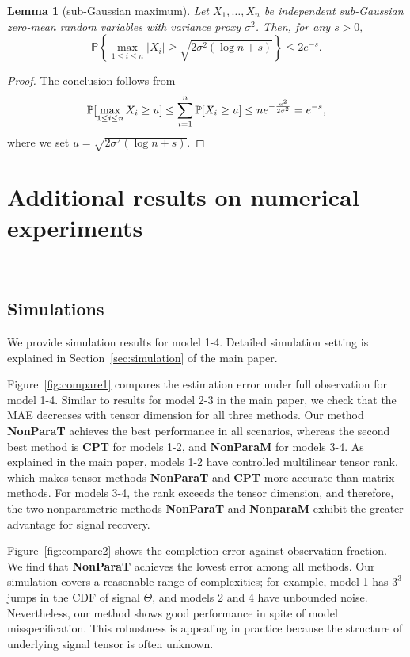 \documentclass[11pt]{article}
\theoremstyle{plain}
\newtheorem{lem}{Lemma}[section]
\theoremstyle{definition}
\begin{document}
\begin{lem}[sub-Gaussian maximum]\label{lem:subg}
Let $X_1,\ldots,X_n$ be independent sub-Gaussian zero-mean random variables with variance proxy $\sigma^2$. Then, for any $s>0,$
\[\mathbb{P}\left\{\max_{1\leq i\leq n}|X_i|\geq\sqrt{2\sigma^2(\log n +s)}\right\}\leq2 e^{-s}.\]
\end{lem}
\begin{proof}
The conclusion follows from
\begin{align}
\mathbb{P}[\max_{1\leq i\leq n}X_i\geq u] \leq \sum_{i=1}^n\mathbb{P}[X_i\geq u]\leq n e^{-{u^2\over 2\sigma^2}} = e^{-s},
\end{align}
where we set $u = \sqrt{2\sigma^2(\log n+s)}.$
\end{proof}




\section{Additional results on numerical experiments}~\label{sec:data}
\subsection{Simulations}
We provide simulation results for model 1-4.  Detailed simulation setting is explained in Section~\ref{sec:simulation} of the main paper.  

Figure~\ref{fig:compare1} compares the estimation error under full observation for model 1-4.  Similar to results for model 2-3 in the main paper,  we check that the MAE decreases with tensor dimension for all three methods. Our method {\bf NonParaT} achieves the best performance in all scenarios, whereas the second best method is {\bf CPT} for models 1-2, and {\bf NonParaM} for models 3-4.  As explained in the main paper, models 1-2 have controlled multilinear tensor rank, which makes tensor methods {\bf NonParaT} and {\bf CPT} more accurate than matrix methods. For models 3-4, the rank exceeds the tensor dimension, and therefore, the two nonparametric methods {\bf NonParaT} and {\bf NonparaM} exhibit the greater advantage for signal recovery. 


Figure~\ref{fig:compare2} shows the completion error against observation fraction.  We find that {\bf NonParaT} achieves the lowest error among all methods. Our simulation covers a reasonable range of  complexities; for example, model 1 has $3^3$ jumps in the CDF of signal $\Theta$, and models 2 and 4 have unbounded noise. Nevertheless, our method shows good performance in spite of model misspecification. This robustness is appealing in practice because the structure of underlying signal tensor is often unknown. 
\end{document}

